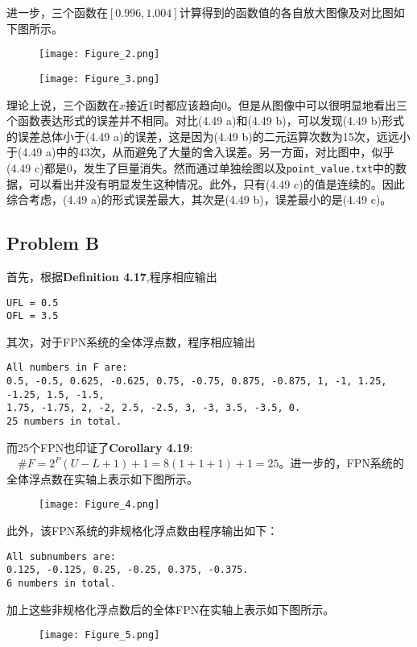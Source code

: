 \documentclass{ctexart}
\begin{document}
\begin{sloppypar}
进一步，三个函数在$[0.996,1.004]$计算得到的函数值的各自放大图像及对比图如下图所示。
\begin{figure}[H]
\centering
\texttt{[image: Figure\_2.png]}
\label{Fig1}
\end{figure}
\begin{figure}[H]
\centering
\texttt{[image: Figure\_3.png]}
\label{Fig1}
\end{figure}
理论上说，三个函数在$x$接近1时都应该趋向0。但是从图像中可以很明显地看出三个函数表达形式的误差并不相同。对比(4.49 a)和(4.49 b)，可以发现(4.49 b)形式的误差总体小于(4.49 a)的误差，这是因为(4.49 b)的二元运算次数为15次，远远小于(4.49 a)中的43次，从而避免了大量的舍入误差。另一方面，对比图中，似乎(4.49 c)都是0，发生了巨量消失。然而通过单独绘图以及\verb|point_value.txt|中的数据，可以看出并没有明显发生这种情况。此外，只有(4.49 c)的值是连续的。因此综合考虑，(4.49 a)的形式误差最大，其次是(4.49 b)，误差最小的是(4.49 c)。
\subsection*{Problem B}
首先，根据\textbf{Definition 4.17},程序相应输出
\begin{shaded}
\begin{verbatim}
UFL = 0.5
OFL = 3.5
\end{verbatim}
\end{shaded}
其次，对于FPN系统的全体浮点数，程序相应输出
\begin{shaded}
\begin{verbatim}
All numbers in F are: 
0.5, -0.5, 0.625, -0.625, 0.75, -0.75, 0.875, -0.875, 1, -1, 1.25, -1.25, 1.5, -1.5,
1.75, -1.75, 2, -2, 2.5, -2.5, 3, -3, 3.5, -3.5, 0. 
25 numbers in total.
\end{verbatim}
\end{shaded}
而25个FPN也印证了\textbf{Corollary 4.19}:$\quad \#F = 2^P(U-L+1)+1 = 8(1+1+1)+1=25$。进一步的，FPN系统的全体浮点数在实轴上表示如下图所示。
\begin{figure}[H]
\centering
\texttt{[image: Figure\_4.png]}
\label{Fig1}
\end{figure}
此外，该FPN系统的非规格化浮点数由程序输出如下：
\begin{shaded}
\begin{verbatim}
All subnumbers are: 
0.125, -0.125, 0.25, -0.25, 0.375, -0.375. 
6 numbers in total.
\end{verbatim}
\end{shaded}
加上这些非规格化浮点数后的全体FPN在实轴上表示如下图所示。
\begin{figure}[H]
\centering
\texttt{[image: Figure\_5.png]}
\label{Fig1}
\end{figure}
\end{sloppypar}
\end{document}
